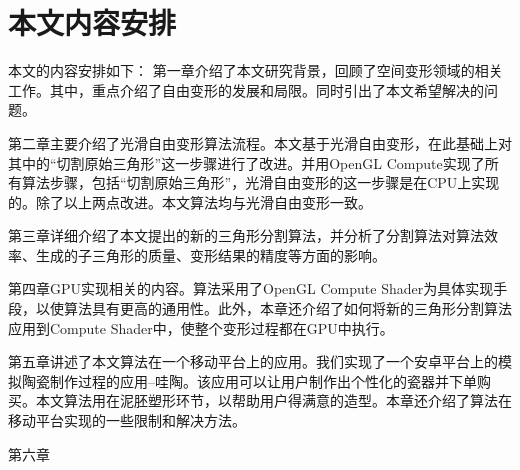 



\section{本文内容安排}
本文的内容安排如下：
第一章介绍了本文研究背景，回顾了空间变形领域的相关工作。其中，重点介绍了自由变形的发展和局限。同时引出了本文希望解决的问题。

第二章主要介绍了光滑自由变形\cite{Cui15}算法流程。本文基于光滑自由变形，在此基础上对其中的“切割原始三角形”这一步骤进行了改进。并用OpenGL Compute实现了所有算法步骤，包括“切割原始三角形”，光滑自由变形的这一步骤是在CPU上实现的。除了以上两点改进。本文算法均与光滑自由变形一致。

第三章详细介绍了本文提出的新的三角形分割算法，并分析了分割算法对算法效率、生成的子三角形的质量、变形结果的精度等方面的影响。

第四章GPU实现相关的内容。算法采用了OpenGL Compute Shader为具体实现手段，以使算法具有更高的通用性。此外，本章还介绍了如何将新的三角形分割算法应用到Compute Shader中，使整个变形过程都在GPU中执行。

第五章讲述了本文算法在一个移动平台上的应用。我们实现了一个安卓平台上的模拟陶瓷制作过程的应用--哇陶。该应用可以让用户制作出个性化的瓷器并下单购买。本文算法用在泥胚塑形环节，以帮助用户得满意的造型。本章还介绍了算法在移动平台实现的一些限制和解决方法。

第六章




